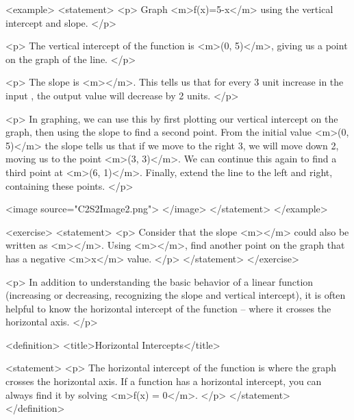         <example>
            <statement>
                <p>
                    Graph <m>f(x)=5-x</m> using the vertical intercept and slope.
                </p>

                <p>
                    The vertical intercept of the function is <m>(0, 5)</m>, giving us a point on the graph of the line.
                </p>

                <p>
                    The slope is <m></m>.
                    This tells us that for every 3 unit increase in the input , the output value will decrease by 2 units.
                </p>

                <p>
                    In graphing, we can use this by first plotting our vertical intercept on the graph, then using the slope to find a second point.
                    From the initial value <m>(0, 5)</m> the slope tells us that if we move to the right 3, we will move down 2, moving us to the point <m>(3, 3)</m>.
                    We can continue this again to find a third point at <m>(6, 1)</m>.
                    Finally, extend the line to the left and right, containing these points.
                </p>

                <image source="C2S2Image2.png">
                </image>
            </statement>
        </example>

        <exercise>
            <statement>
                <p>
                    Consider that the slope <m></m> could also be written as <m></m>.
                    Using <m></m>, find another point on the graph that has a negative <m>x</m> value.
                </p>
            </statement>
        </exercise>

        <p>
            In addition to understanding the basic behavior of a linear function (increasing or decreasing, recognizing the slope and vertical intercept), it is often helpful to know the horizontal intercept of the function – where it crosses the horizontal axis.
        </p>

        <definition>
            <title>Horizontal Intercepts</title>

            <statement>
                <p>
                    The horizontal intercept of the function is where the graph crosses the horizontal axis.
                    If a function has a horizontal intercept, you can always find it by solving <m>f(x) = 0</m>.
                </p>
            </statement>
        </definition>

